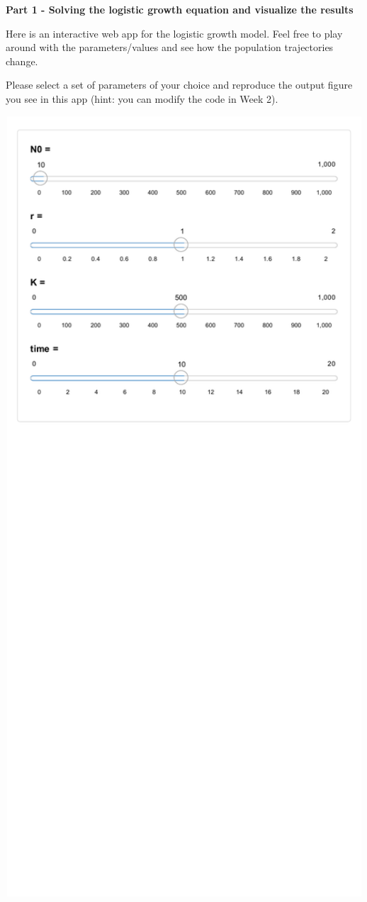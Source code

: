 \documentclass[
]{book}
\begin{document}
\textbf{Part 1 - Solving the logistic growth equation and visualize the results}

Here is an interactive web app for the logistic growth model. Feel free to play around with the parameters/values and see how the population trajectories change.

Please select a set of parameters of your choice and reproduce the output figure you see in this app (hint: you can modify the code in Week 2).

\href{https://genchanghsu0115.shinyapps.io/Logistic_mod_shinyapp/}{\includegraphics[width=800px]{03_Week_3_files/figure-latex/unnamed-chunk-2-1} }
\end{document}
